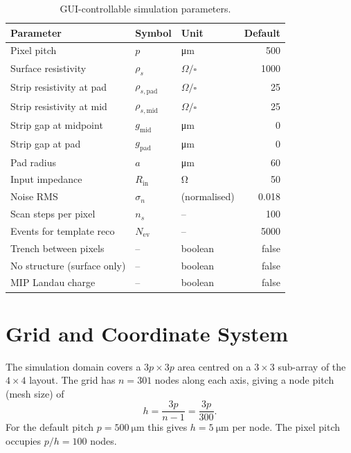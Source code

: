 \documentclass[preprint,numbers,1p]{elsarticle}
\begin{document}
\begin{table}[h]
\centering
\caption{GUI-controllable simulation parameters.}
\label{tab:params}
\begin{tabular}{lllr}
\toprule
Parameter & Symbol & Unit & Default \\
\midrule
Pixel pitch & $p$ & \si{\micro\meter} & 500 \\
Surface resistivity & $\rho_s$ & $\Omega/\square$ & 1000 \\
Strip resistivity at pad & $\rho_{s,\mathrm{pad}}$ & $\Omega/\square$ & 25 \\
Strip resistivity at mid & $\rho_{s,\mathrm{mid}}$ & $\Omega/\square$ & 25 \\
Strip gap at midpoint & $g_\mathrm{mid}$ & \si{\micro\meter} & 0 \\
Strip gap at pad & $g_\mathrm{pad}$ & \si{\micro\meter} & 0 \\
Pad radius & $a$ & \si{\micro\meter} & 60 \\
Input impedance & $R_\mathrm{in}$ & \si{\ohm} & 50 \\
Noise RMS & $\sigma_n$ & (normalised) & 0.018 \\
Scan steps per pixel & $n_s$ & -- & 100 \\
Events for template reco & $N_\mathrm{ev}$ & -- & 5000 \\
Trench between pixels & -- & boolean & false \\
No structure (surface only) & -- & boolean & false \\
MIP Landau charge & -- & boolean & false \\
\bottomrule
\end{tabular}
\end{table}

\section{Grid and Coordinate System}
\label{sec:grid}

The simulation domain covers a $3p \times 3p$ area centred on a $3\times3$ sub-array of the
$4\times4$ layout. The grid has $n = 301$ nodes along each axis, giving a node pitch (mesh
size) of
\begin{equation}
  h = \frac{3p}{n-1} = \frac{3p}{300}.
\end{equation}
For the default pitch $p = \SI{500}{\micro\meter}$ this gives $h = \SI{5}{\micro\meter}$ per
node. The pixel pitch occupies $p/h = 100$ nodes.
\end{document}
